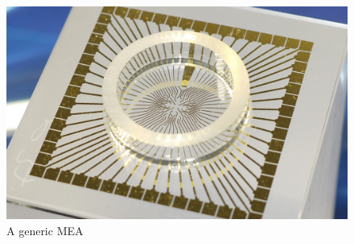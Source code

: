 \begin{figure}[h!]
    \includegraphics[width=\linewidth]{images/MEA.jpg}
    \caption{A generic MEA}
    \label{fig:generic_MEA}
\end{figure}

